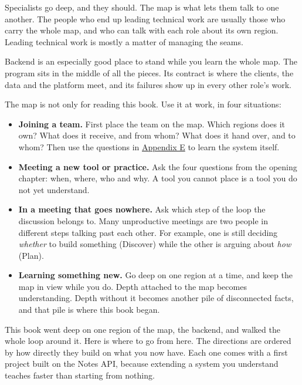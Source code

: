 Specialists go deep, and they should. The map is what lets them talk to one another. The people who end up leading technical work are usually those who carry the whole map, and who can talk with each role about its own region. Leading technical work is mostly a matter of managing the seams.

Backend is an especially good place to stand while you learn the whole map. The program sits in the middle of all the pieces. Its contract is where the clients, the data and the platform meet, and its failures show up in every other role's work.

\label{the-same-process-in-a-team:using-the-map-from-now-on}

The map is not only for reading this book. Use it at work, in four situations:

\begin{itemize}
\tightlist
\item
  \textbf{Joining a team.} First place the team on the map. Which regions does it own? What does it receive, and from whom? What does it hand over, and to whom? Then use the questions in \hyperref[ch:44-appendices-5]{Appendix E} to learn the system itself.
\item
  \textbf{Meeting a new tool or practice.} Ask the four questions from the opening chapter: when, where, who and why. A tool you cannot place is a tool you do not yet understand.
\item
  \textbf{In a meeting that goes nowhere.} Ask which step of the loop the discussion belongs to. Many unproductive meetings are two people in different steps talking past each other. For example, one is still deciding \emph{whether} to build something (Discover) while the other is arguing about \emph{how} (Plan).
\item
  \textbf{Learning something new.} Go deep on one region at a time, and keep the map in view while you do. Depth attached to the map becomes understanding. Depth without it becomes another pile of disconnected facts, and that pile is where this book began.
\end{itemize}

\label{the-same-process-in-a-team:where-to-go-next}

This book went deep on one region of the map, the backend, and walked the whole loop around it. Here is where to go from here. The directions are ordered by how directly they build on what you now have. Each one comes with a first project built on the Notes API, because extending a system you understand teaches faster than starting from nothing.

